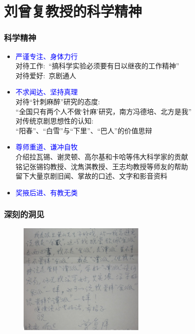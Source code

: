 \section{刘曾复教授的科学精神}
\frame
{
	\frametitle{科学精神}
	\begin{itemize}
		\item \textcolor{blue}{严谨专注、身体力行}\\
			对待工作:~``搞科学实验必须要有日以继夜的工作精神''\\
			\vskip 1pt
			对待爱好:~京剧通人 
		\item \textcolor{blue}{不求闻达、坚持真理}\\
			对待``针刺麻醉''研究的态度:\\
			``全国只有两个人不做‘针麻’研究，南方冯德培、北方是我''\\
			\vskip 1pt
			对传统京剧思想性的认知:\\
			``阳春''、``白雪''与``下里''、``巴人''的价值思辩
		\item \textcolor{blue}{尊师重道、谦冲自牧}\\
			介绍拉瓦锡、谢灵顿、高尔基和卡哈等伟大科学家的贡献\\
			铭记张锡钧教授、沈雋淇教授、王志均教授等师友的帮助\\
			\vskip 1pt
			留下大量京剧旧闻、掌故的口述、文字和影音资料
		\item \textcolor{blue}{奖掖后进、有教无类}
	\end{itemize}
}

\frame
{
	\frametitle{深刻的洞见}
{\fontsize{7.2pt}{4.2pt}}
\begin{figure}[h!]
\centering
\vspace{0.05in}
\includegraphics[height=0.45\textwidth,width=0.55\textwidth,viewport=0 0 1198 1067,clip]{Figures_Peking-Opera/Liu_Letter.jpg}
\label{Liu_Letter}
\end{figure}
}

